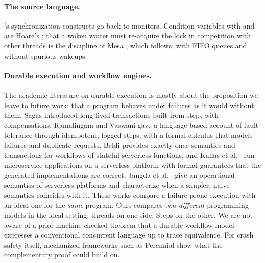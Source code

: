 \paragraph{The source language.}
\Lang{}'s synchronization constructs go back to monitors. Condition
variables with  and  are Hoare's
\cite{hoare1974monitors}; that a woken waiter must re-acquire the lock in
competition with other threads is the discipline of Mesa
\cite{lampson1980mesa}, which \Lang{} follows, with FIFO queues and without
spurious wakeups.

\paragraph{Durable execution and workflow engines.}
The academic literature on durable execution is mostly about the
proposition we leave to future work: that a program behaves under failures
as it would without them. Sagas \cite{garciamolina1987sagas} introduced
long-lived transactions built from steps with compensations. Ramalingam and
Vaswani \cite{ramalingam2013idempotence} gave a language-based account of
fault tolerance through idempotent, logged steps, with a formal calculus
that models failures and duplicate requests. Beldi
\cite{zhang2020beldi} provides exactly-once semantics and transactions for
workflows of stateful serverless functions, and Kallas et al.\
\cite{kallas2023mu2sls} run microservice applications on a serverless
platform with formal guarantees that the generated implementations are
correct. Jangda et al.\ \cite{jangda2019serverless} give an operational
semantics of serverless platforms and characterize when a simpler, naive
semantics coincides with it. These works compare a failure-prone
execution with an ideal one for the \emph{same} program. Ours compares two
\emph{different} programming models in the ideal setting: threads on one
side, Steps on the other. We are not aware of a prior machine-checked
theorem that a durable workflow model expresses a conventional concurrent
language up to trace equivalence. For crash safety itself, mechanized
frameworks such as Perennial \cite{chajed2019perennial} show what the
complementary proof could build on.
